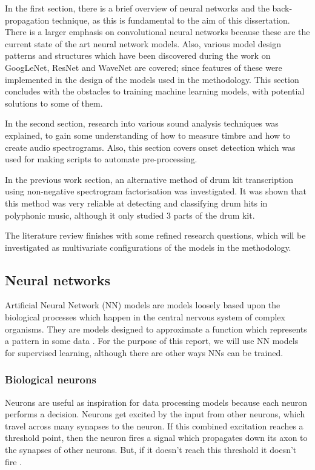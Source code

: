 \documentclass[12pt]{article}
\begin{document}
	In the first section, there is a brief overview of neural networks and the back-propagation technique, as this is fundamental to the aim of this dissertation. There is a larger emphasis on convolutional neural networks because these are the current state of the art neural network models. Also, various model design patterns and structures which have been discovered during the work on GoogLeNet, ResNet and WaveNet are covered; since features of these were implemented in the design of the models used in the methodology. This section concludes with the obstacles to training machine learning models, with potential solutions to some of them.\medskip
	
	In the second section, research into various sound analysis techniques was explained, to gain some understanding of how to measure timbre and how to create audio spectrograms. Also, this section covers onset detection which was used for making scripts to automate pre-processing.\medskip
	
	In the previous work section, an alternative method of drum kit transcription using non-negative spectrogram factorisation was investigated. It was shown that this method was very reliable at detecting and classifying drum hits in polyphonic music, although it only studied 3 parts of the drum kit.\medskip
	
	The literature review finishes with some refined research questions, which will be investigated as multivariate configurations of the models in the methodology.\medskip
	
	\subsection{Neural networks}
	\label{sec:neural_networks}
	
	Artificial Neural Network (NN) models are models loosely based upon the biological processes which happen in the central nervous system of complex organisms. They are models designed to approximate a function which represents a pattern in some data \parencite{Russell;Norvig1995}. For the purpose of this report, we will use NN models for supervised learning, although there are other ways NNs can be trained.\medskip
	
	\subsubsection{Biological neurons}
	\label{sec:biological_neurons}
	
	Neurons are useful as inspiration for data processing models because each neuron performs a decision. Neurons get excited by the input from other neurons, which travel across many synapses to the neuron. If this combined excitation reaches a threshold point, then the neuron fires a signal which propagates down its axon to the synapses of other neurons. But, if it doesn't reach this threshold it doesn't fire \parencite[p.18-20]{Rojas}.\medskip
	
\end{document}
